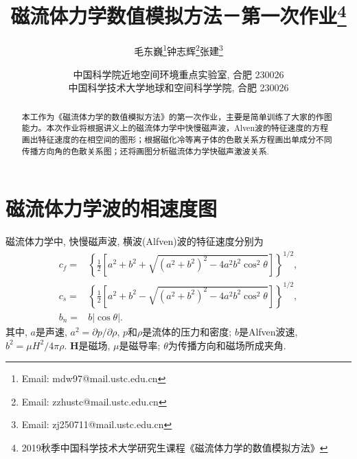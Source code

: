 \documentclass{article}
\begin{document}
	
	\renewcommand{\refname}{参考文献}
	\renewcommand{\figurename}{图}
	\renewcommand{\abstractname}{摘要}
	\def\due{2019年9月25日周三0:00}
	
	\title{磁流体力学数值模拟方法－第一次作业\footnote{2019秋季中国科学技术大学研究生课程《磁流体力学的数值模拟方法》}}
	
	
	\author{毛东巍\footnote{Email: mdw97@mail.ustc.edu.cn}\quad 钟志辉\footnote{Email: zzhustc@mail.ustc.edu.cn}\quad 张建\footnote{Email: zj250711@mail.ustc.edu.cn}}
	
	\date{%
		\scriptsize%
		中国科学院近地空间环境重点实验室, 合肥 230026\\
		中国科学技术大学地球和空间科学学院, 合肥 230026
	}
	
	\maketitle
	
	\begin{abstract}
		本工作为《磁流体力学的数值模拟方法》的第一次作业，主要是简单训练了大家的作图能力。本次作业将根据讲义上的磁流体力学中快慢磁声波，Alven波的特征速度的方程画出特征速度的在相空间的图形；根据磁化冷等离子体的色散关系方程画出单成分不同传播方向角的色散关系图；还将画图分析磁流体力学快磁声激波关系.
	\end{abstract}
	
	\section{磁流体力学波的相速度图}
	
	磁流体力学中, 快慢磁声波, 横波(Alfven)波的特征速度分别为\citep{Jeffrey1964}
	\begin{align}
		c_f =& \left\{\frac{1}{2} \left[a^2 + b^2 + \sqrt{(a^2 + b^2)^2 - 4 a^2 b^2
			\cos^2\theta}\right]\right\}^{1/2},
		\\
		c_s =& \left\{\frac{1}{2} \left[a^2 + b^2 - \sqrt{(a^2 + b^2)^2 - 4 a^2 b^2
			\cos^2\theta}\right]\right\}^{1/2},
		\\
		b_n =& b \left|\cos\theta\right|.
	\end{align}
	其中, $a$是声速, $a^2 = \partial p / \partial \rho$, $p$和$\rho$是流体的压力和密度;
	$b$是Alfven波速, $b^2 = \mu H^2 / 4 \pi \rho$. $\boldsymbol{H}$是磁场, $\mu$是磁导率;
	$\theta$为传播方向和磁场所成夹角.
	
\end{document}
